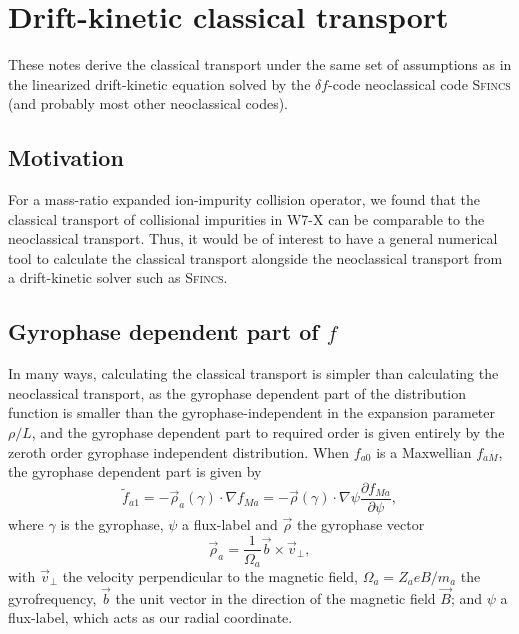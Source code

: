 \documentclass[12pt, a4paper]{article}
\newcommand{\p}{\ensuremath{\partial}}
\begin{document}
\section{Drift-kinetic classical transport}
These notes derive the classical transport under the same set of assumptions as in the linearized drift-kinetic equation solved by the $\delta f$-code neoclassical code \textsc{Sfincs} (and probably most other neoclassical codes). 

\subsection{Motivation}
For a mass-ratio expanded ion-impurity collision operator, we found that the classical transport of collisional impurities in W7-X can be comparable to the neoclassical transport. Thus, it would be of interest to have a general numerical tool to calculate the classical transport alongside the neoclassical transport from a drift-kinetic solver such as \textsc{Sfincs}.


\subsection{Gyrophase dependent part of $f$}
In many ways, calculating the classical transport is simpler than calculating the neoclassical transport, as the gyrophase dependent part of the distribution function is smaller than the gyrophase-independent in the expansion parameter $\rho/L$, and the gyrophase dependent part to required order is given entirely by the zeroth order gyrophase independent distribution. When $f_{a0}$ is a Maxwellian $f_{aM}$, the gyrophase dependent part is given by
\begin{equation}
\tilde{f}_{a1} = -\vec{\rho}_a(\gamma) \cdot \nabla f_{Ma} = -\vec{\rho}(\gamma) \cdot \nabla \psi  \frac{\p f_{Ma}}{\p \psi}, \label{eq:ftilde}
\end{equation}
where $\gamma$ is the gyrophase, $\psi$ a flux-label and $\vec{\rho}$ the gyrophase vector
\begin{equation}
\vec{\rho}_a = \frac{1}{\Omega_a}\vec{b} \times \vec{v}_\perp,
\end{equation}
with $\vec{v}_\perp$ the velocity perpendicular to the magnetic field, $\Omega_a=Z_a eB/m_a$ the gyrofrequency, $\vec{b}$ the unit vector in the direction of the magnetic field $\vec{B}$; and $\psi$ a flux-label, which acts as our radial coordinate.
\end{document}
